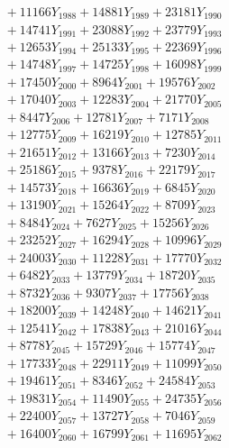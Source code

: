 \documentclass[a4paper,10pt]{article}
\begin{document}
{\begin{align}
&\;  + 11166 Y_{1988} + 14881 Y_{1989} + 23181 Y_{1990} \\[0.3ex]
&\;  + 14741 Y_{1991} + 23088 Y_{1992} + 23779 Y_{1993} \\[0.3ex]
&\;  + 12653 Y_{1994} + 25133 Y_{1995} + 22369 Y_{1996} \\[0.3ex]
&\;  + 14748 Y_{1997} + 14725 Y_{1998} + 16098 Y_{1999} \\[0.3ex]
&\;  + 17450 Y_{2000} + 8964 Y_{2001} + 19576 Y_{2002} \\[0.3ex]
&\;  + 17040 Y_{2003} + 12283 Y_{2004} + 21770 Y_{2005} \\[0.3ex]
&\;  + 8447 Y_{2006} + 12781 Y_{2007} + 7171 Y_{2008} \\[0.5ex]\allowbreak
&\;  + 12775 Y_{2009} + 16219 Y_{2010} + 12785 Y_{2011} \\[0.3ex]
&\;  + 21651 Y_{2012} + 13166 Y_{2013} + 7230 Y_{2014} \\[0.3ex]
&\;  + 25186 Y_{2015} + 9378 Y_{2016} + 22179 Y_{2017} \\[0.3ex]
&\;  + 14573 Y_{2018} + 16636 Y_{2019} + 6845 Y_{2020} \\[0.3ex]
&\;  + 13190 Y_{2021} + 15264 Y_{2022} + 8709 Y_{2023} \\[0.3ex]
&\;  + 8484 Y_{2024} + 7627 Y_{2025} + 15256 Y_{2026} \\[0.3ex]
&\;  + 23252 Y_{2027} + 16294 Y_{2028} + 10996 Y_{2029} \\[0.3ex]
&\;  + 24003 Y_{2030} + 11228 Y_{2031} + 17770 Y_{2032} \\[0.3ex]
&\;  + 6482 Y_{2033} + 13779 Y_{2034} + 18720 Y_{2035} \\[0.3ex]
&\;  + 8732 Y_{2036} + 9307 Y_{2037} + 17756 Y_{2038} \\[0.5ex]\allowbreak
&\;  + 18200 Y_{2039} + 14248 Y_{2040} + 14621 Y_{2041} \\[0.3ex]
&\;  + 12541 Y_{2042} + 17838 Y_{2043} + 21016 Y_{2044} \\[0.3ex]
&\;  + 8778 Y_{2045} + 15729 Y_{2046} + 15774 Y_{2047} \\[0.3ex]
&\;  + 17733 Y_{2048} + 22911 Y_{2049} + 11099 Y_{2050} \\[0.3ex]
&\;  + 19461 Y_{2051} + 8346 Y_{2052} + 24584 Y_{2053} \\[0.3ex]
&\;  + 19831 Y_{2054} + 11490 Y_{2055} + 24735 Y_{2056} \\[0.3ex]
&\;  + 22400 Y_{2057} + 13727 Y_{2058} + 7046 Y_{2059} \\[0.3ex]
&\;  + 16400 Y_{2060} + 16799 Y_{2061} + 11695 Y_{2062} \\[0.3ex]

\end{align}}
\end{document}
